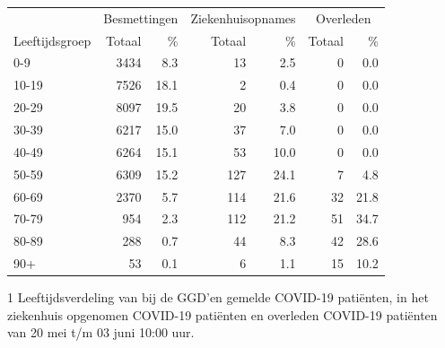 \documentclass[
  english,
  man,floatsintext]{apa6}
\begin{document}
\begin{table}
\centering\begingroup\fontsize{11}{13}\selectfont

\begin{threeparttable}
\begin{tabular}{lrrrrrr}
\toprule
\multicolumn{1}{c}{ } & \multicolumn{2}{c}{Besmettingen} & \multicolumn{2}{c}{Ziekenhuisopnames} & \multicolumn{2}{c}{Overleden} \\
\cmidrule(l{3pt}r{3pt}){2-3} \cmidrule(l{3pt}r{3pt}){4-5} \cmidrule(l{3pt}r{3pt}){6-7}
Leeftijdsgroep & Totaal & \% & Totaal & \% & Totaal & \%\\
\midrule
0-9 & 3434 & 8.3 & 13 & 2.5 & 0 & 0.0\\
10-19 & 7526 & 18.1 & 2 & 0.4 & 0 & 0.0\\
20-29 & 8097 & 19.5 & 20 & 3.8 & 0 & 0.0\\
30-39 & 6217 & 15.0 & 37 & 7.0 & 0 & 0.0\\
40-49 & 6264 & 15.1 & 53 & 10.0 & 0 & 0.0\\
50-59 & 6309 & 15.2 & 127 & 24.1 & 7 & 4.8\\
60-69 & 2370 & 5.7 & 114 & 21.6 & 32 & 21.8\\
70-79 & 954 & 2.3 & 112 & 21.2 & 51 & 34.7\\
80-89 & 288 & 0.7 & 44 & 8.3 & 42 & 28.6\\
90+ & 53 & 0.1 & 6 & 1.1 & 15 & 10.2\\
\bottomrule
\end{tabular}
\begin{tablenotes}
\item[1] Leeftijdsverdeling van bij de GGD’en gemelde COVID-19 patiënten, in het ziekenhuis opgenomen COVID-19 patiënten en overleden COVID-19 patiënten van 20 mei t/m 03 juni 10:00 uur.
\end{tablenotes}
\end{threeparttable}
\endgroup{}
\end{table}

\newpage
\end{document}

